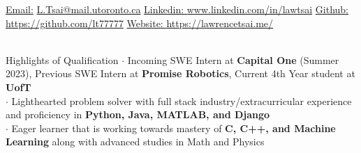 \documentclass[UTF8]{resume} %
\begin{document}
  \scriptsize\underline{Email:}
            \href{L.Tsai@mail.utoronto.ca}{L.Tsai@mail.utoronto.ca}     {  }
            {\scriptsize\underline{Linkedin: }}\href{https://www.linkedin.com/in/lawtsai}{www.linkedin.com/in/lawtsai}
            {        }
           {\scriptsize\underline{Github: }}\href{https://github.com/lt77777}{https://github.com/lt77777}
           {        }
           {\scriptsize\underline{Website: }}\href{https://lawrencetsai.me/}{https://lawrencetsai.me/}\\
~\vspace{-0.6cm}


\begin{rSection}{Highlights of Qualification}
    \scriptsize{
    $\cdot$ Incoming SWE Intern at \textbf{Capital One} (Summer 2023), Previous SWE Intern at \textbf{Promise Robotics}, Current 4th Year student at \textbf{UofT}\\
    $\cdot$ Lighthearted problem solver with full stack industry/extracurricular experience and proficiency in \textbf{Python, Java, MATLAB, and Django}\\
    $\cdot$ Eager learner that is working towards mastery of \textbf{C, C++, and Machine Learning} along with advanced studies in Math and Physics
    }
\end{rSection}
\end{document}
